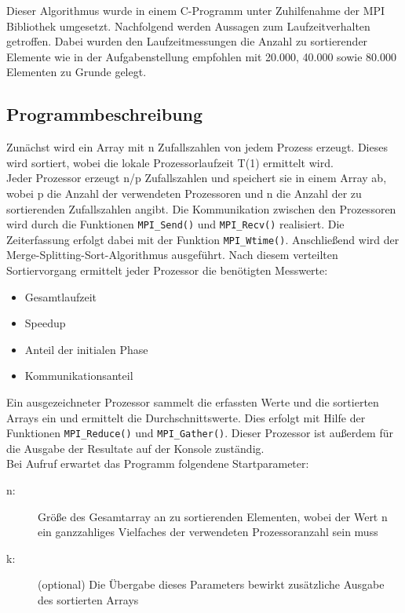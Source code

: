 \documentclass[a4paper,12pt]{scrartcl}
\begin{document}
Dieser Algorithmus wurde in einem C-Programm unter Zuhilfenahme der MPI Bibliothek umgesetzt.
Nachfolgend werden Aussagen zum Laufzeitverhalten getroffen. Dabei wurden den Laufzeitmessungen die Anzahl zu sortierender Elemente wie in der Aufgabenstellung
empfohlen mit 20.000, 40.000 sowie 80.000 Elementen zu Grunde gelegt.

\subsection{Programmbeschreibung}
Zun\"achst wird ein Array mit n Zufallszahlen von jedem Prozess erzeugt. Dieses wird sortiert, wobei die lokale Prozessorlaufzeit T(1) ermittelt wird.\\
Jeder Prozessor erzeugt n/p Zufallszahlen und speichert sie in einem Array ab, wobei p die Anzahl der verwendeten Prozessoren und n die Anzahl der zu sortierenden Zufallszahlen angibt. Die Kommunikation zwischen den
Prozessoren wird durch die Funktionen \texttt{MPI\_Send()} und \texttt{MPI\_Recv()} realisiert. Die Zeiterfassung erfolgt dabei mit der
Funktion \texttt{MPI\_Wtime()}. Anschlie\ss{}end wird der Merge-Splitting-Sort-Algorithmus ausgef\"uhrt. Nach diesem verteilten Sortiervorgang ermittelt jeder
Prozessor die ben\"otigten Messwerte:
\begin{itemize}
 \item Gesamtlaufzeit
 \item Speedup
 \item Anteil der initialen Phase
 \item Kommunikationsanteil
\end{itemize}
Ein ausgezeichneter Prozessor sammelt die erfassten Werte und die sortierten Arrays ein und ermittelt die Durchschnittswerte. Dies erfolgt mit Hilfe der
Funktionen \texttt{MPI\_Reduce()} und \texttt{MPI\_Gather()}. Dieser Prozessor ist au\ss{}erdem f\"ur die Ausgabe der Resultate auf der Konsole zust\"andig.\\

Bei Aufruf erwartet das Programm folgendene Startparameter:
\begin{description}
 \item [n:]  Gr\"o\ss{}e des Gesamtarray an zu sortierenden Elementen, wobei der Wert n ein ganzzahliges Vielfaches der verwendeten
Prozessoranzahl sein muss
 \item [k:]  (optional) Die \"Ubergabe dieses Parameters bewirkt zus\"atzliche Ausgabe des sortierten Arrays
\end{description}
\end{document}
